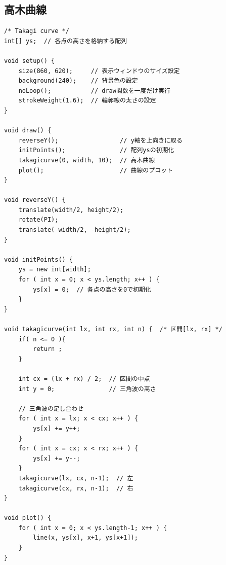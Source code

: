 \documentclass[dvipdfmx]{jsarticle}
\theoremstyle{definition}
\begin{document}
\subsection{高木曲線}  \label{subsec_code_takagi_curve}
\begin{lstlisting}[caption=高木曲線, label=code_takagi_curve_all]
/* Takagi curve */
int[] ys;  // 各点の高さを格納する配列

void setup() {
    size(860, 620);     // 表示ウィンドウのサイズ設定
    background(240);    // 背景色の設定
    noLoop();           // draw関数を一度だけ実行
    strokeWeight(1.6);  // 輪郭線の太さの設定
}

void draw() {
    reverseY();                 // y軸を上向きに取る
    initPoints();               // 配列ysの初期化
    takagicurve(0, width, 10);  // 高木曲線
    plot();                     // 曲線のプロット
}

void reverseY() {
    translate(width/2, height/2);
    rotate(PI);
    translate(-width/2, -height/2);
}

void initPoints() {
    ys = new int[width];
    for ( int x = 0; x < ys.length; x++ ) {
        ys[x] = 0;  // 各点の高さを0で初期化
    }
}

void takagicurve(int lx, int rx, int n) {  /* 区間[lx, rx] */
    if( n <= 0 ){
        return ;
    }

    int cx = (lx + rx) / 2;  // 区間の中点
    int y = 0;               // 三角波の高さ

    // 三角波の足し合わせ
    for ( int x = lx; x < cx; x++ ) {
        ys[x] += y++;
    }
    for ( int x = cx; x < rx; x++ ) {
        ys[x] += y--;
    }
    takagicurve(lx, cx, n-1);  // 左
    takagicurve(cx, rx, n-1);  // 右
}

void plot() {
    for ( int x = 0; x < ys.length-1; x++ ) {
        line(x, ys[x], x+1, ys[x+1]);
    }
}
\end{lstlisting}
\clearpage

\end{document}
